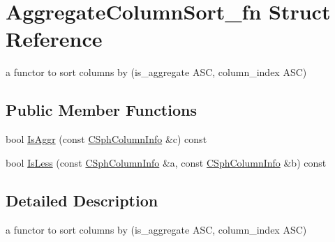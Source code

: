 \hypertarget{structAggregateColumnSort__fn}{\section{Aggregate\-Column\-Sort\-\_\-fn Struct Reference}
\label{structAggregateColumnSort__fn}
}


a functor to sort columns by (is\-\_\-aggregate A\-S\-C, column\-\_\-index A\-S\-C)  


\subsection*{Public Member Functions}
\begin{DoxyCompactItemize}
\item 
bool \hyperlink{structAggregateColumnSort__fn_add69da75f4c81d9d89be1ea842bf2431}{Is\-Aggr} (const \hyperlink{structCSphColumnInfo}{C\-Sph\-Column\-Info} \&c) const 
\item 
bool \hyperlink{structAggregateColumnSort__fn_a048b612c2a66800bedbdeec8591fdbc4}{Is\-Less} (const \hyperlink{structCSphColumnInfo}{C\-Sph\-Column\-Info} \&a, const \hyperlink{structCSphColumnInfo}{C\-Sph\-Column\-Info} \&b) const 
\end{DoxyCompactItemize}


\subsection{Detailed Description}
a functor to sort columns by (is\-\_\-aggregate A\-S\-C, column\-\_\-index A\-S\-C) 

